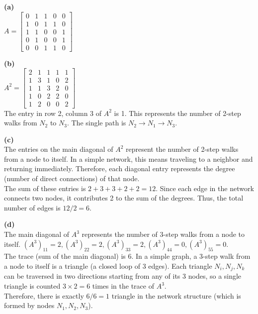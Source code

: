 \begin{solution}
\textbf{(a)} \\
$A = \begin{bmatrix} 0 & 1 & 1 & 0 & 0 \\ 1 & 0 & 1 & 1 & 0 \\ 1 & 1 & 0 & 0 & 1 \\ 0 & 1 & 0 & 0 & 1 \\ 0 & 0 & 1 & 1 & 0 \end{bmatrix}$

\medskip
\textbf{(b)} \\
$A^2 = \begin{bmatrix} 2 & 1 & 1 & 1 & 1 \\ 1 & 3 & 1 & 0 & 2 \\ 1 & 1 & 3 & 2 & 0 \\ 1 & 0 & 2 & 2 & 0 \\ 1 & 2 & 0 & 0 & 2 \end{bmatrix}$ \\
The entry in row 2, column 3 of $A^2$ is 1. This represents the number of 2-step walks from $N_2$ to $N_3$. The single path is $N_2 \to N_1 \to N_3$.

\medskip
\textbf{(c)} \\
The entries on the main diagonal of $A^2$ represent the number of 2-step walks from a node to itself. In a simple network, this means traveling to a neighbor and returning immediately. Therefore, each diagonal entry represents the degree (number of direct connections) of that node. \\
The sum of these entries is $2 + 3 + 3 + 2 + 2 = 12$. Since each edge in the network connects two nodes, it contributes 2 to the sum of the degrees. Thus, the total number of edges is $12 / 2 = 6$.

\medskip
\textbf{(d)} \\
The main diagonal of $A^3$ represents the number of 3-step walks from a node to itself.
$(A^3)_{11}=2, (A^3)_{22}=2, (A^3)_{33}=2, (A^3)_{44}=0, (A^3)_{55}=0$. \\
The trace (sum of the main diagonal) is 6. In a simple graph, a 3-step walk from a node to itself is a triangle (a closed loop of 3 edges). Each triangle $N_i, N_j, N_k$ can be traversed in two directions starting from any of its 3 nodes, so a single triangle is counted $3 \times 2 = 6$ times in the trace of $A^3$. \\
Therefore, there is exactly $6 / 6 = 1$ triangle in the network structure (which is formed by nodes $N_1, N_2, N_3$).
\end{solution}

